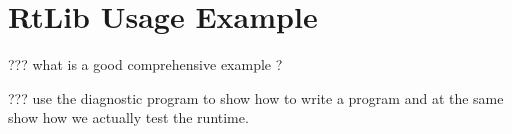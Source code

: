 %
\chapter{ RtLib Usage Example}

??? what is a good comprehensive example ?

??? use the diagnostic program to show how to write a program and at the same show how we actually test the runtime. 